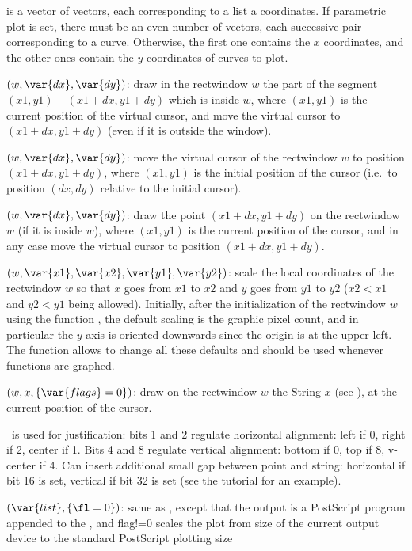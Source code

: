  is a vector of vectors, each corresponding to a list a coordinates.
If parametric plot is set, there must be an even number of vectors, each
successive pair corresponding to a curve. Otherwise, the first one contains
the $x$ coordinates, and the other ones contain the $y$-coordinates
of curves to plot.

$(w,\var{dx},\var{dy})$: \label{se:plotrline}draw in the rectwindow $w$ the part of the segment
$(x1,y1)-(x1+dx,y1+dy)$ which is inside $w$, where $(x1,y1)$ is the current
position of the virtual cursor, and move the virtual cursor to
$(x1+dx,y1+dy)$ (even if it is outside the window).

$(w,\var{dx},\var{dy})$: \label{se:plotrmove}move the virtual cursor of the rectwindow $w$ to position
$(x1+dx,y1+dy)$, where $(x1,y1)$ is the initial position of the cursor
(i.e.~to position $(dx,dy)$ relative to the initial cursor).

$(w,\var{dx},\var{dy})$: \label{se:plotrpoint}draw the point $(x1+dx,y1+dy)$ on the rectwindow $w$ (if it is inside
$w$), where $(x1,y1)$ is the current position of the cursor, and in any case
move the virtual cursor to position $(x1+dx,y1+dy)$.

$(w,\var{x1},\var{x2},\var{y1},\var{y2})$: \label{se:plotscale}scale the local coordinates of the rectwindow $w$ so that $x$ goes from
$x1$ to $x2$ and $y$ goes from $y1$ to $y2$ ($x2<x1$ and $y2<y1$ being
allowed). Initially, after the initialization of the rectwindow $w$ using
the function , the default scaling is the graphic pixel count,
and in particular the $y$ axis is oriented downwards since the origin is at
the upper left. The function  allows to change all these
defaults and should be used whenever functions are graphed.

$(w,x,\{\var{flags}=0\})$: \label{se:plotstring}draw on the rectwindow $w$ the String $x$ (see ), at
the current position of the cursor.

\fl\ is used for justification: bits 1 and 2 regulate horizontal alignment:
left if 0, right if 2, center if 1. Bits 4 and 8 regulate vertical
alignment: bottom if 0, top if 8, v-center if 4. Can insert additional small
gap between point and string: horizontal if bit 16 is set, vertical if bit
32 is set (see the tutorial for an example).

$(\var{list}, \{\fl=0\})$: \label{se:psdraw}same as , except that the output is a PostScript program
appended to the , and flag!=0 scales the plot from size of the
current output device to the standard PostScript plotting size

